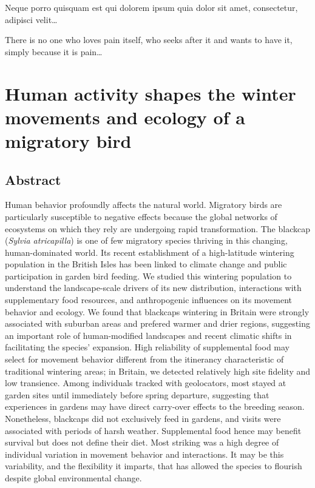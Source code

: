 \documentclass[a4paper, twoside]{templates/ociamthesis}
\begin{document}
\begin{savequote}
Neque porro quisquam est qui dolorem ipsum quia dolor sit amet,
consectetur, adipisci velit\ldots{}

There is no one who loves pain itself, who seeks after it and wants to
have it, simply because it is pain\ldots{}
\end{savequote}

\hypertarget{blackcap-uk}{%
\chapter{Human activity shapes the winter movements and ecology of a migratory bird}\label{blackcap-uk}}

\minitoc 

\hypertarget{abstract}{%
\section{Abstract}\label{abstract}}

Human behavior profoundly affects the natural world. Migratory birds are particularly susceptible to negative effects because the global networks of ecosystems on which they rely are undergoing rapid transformation. The blackcap (\emph{Sylvia atricapilla}) is one of few migratory species thriving in this changing, human-dominated world. Its recent establishment of a high-latitude wintering population in the British Isles has been linked to climate change and public participation in garden bird feeding. We studied this wintering population to understand the landscape-scale drivers of its new distribution, interactions with supplementary food resources, and anthropogenic influences on its movement behavior and ecology. We found that blackcaps wintering in Britain were strongly associated with suburban areas and prefered warmer and drier regions, suggesting an important role of human-modified landscapes and recent climatic shifts in facilitating the species' expansion. High reliability of supplemental food may select for movement behavior different from the itinerancy characteristic of traditional wintering areas; in Britain, we detected relatively high site fidelity and low transience. Among individuals tracked with geolocators, most stayed at garden sites until immediately before spring departure, suggesting that experiences in gardens may have direct carry-over effects to the breeding season. Nonetheless, blackcaps did not exclusively feed in gardens, and visits were associated with periods of harsh weather. Supplemental food hence may benefit survival but does not define their diet. Most striking was a high degree of individual variation in movement behavior and interactions. It may be this variability, and the flexibility it imparts, that has allowed the species to flourish despite global environmental change.
\end{document}
